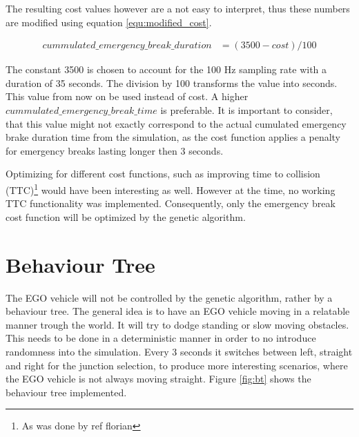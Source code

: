The resulting cost values however are a not easy to interpret, thus these numbers are modified using equation \ref{equ:modified_cost}.

\begin{equation} 
	\label{equ:modified_cost}
	\begin{split}
		cummulated\_emergency\_break\_duration & = (3500 - cost) / 100
	\end{split}
\end{equation}

The constant 3500 is chosen to account for the 100 Hz sampling rate with a duration of 35 seconds. The division by 100 transforms the value into seconds. This value from now on be used instead of cost. A higher $cummulated\_emergency\_break\_time$ is preferable. It is important to consider, that this value might not exactly correspond to the actual cumulated emergency brake duration time from the simulation, as the cost function applies a penalty for emergency breaks lasting longer then 3 seconds.

Optimizing for different cost functions, such as improving time to collision (TTC)\footnote{As was done by ref florian} would have been interesting as well. However at the time, no working TTC functionality was implemented. Consequently, only the emergency break cost function will be optimized by the genetic algorithm.

\section{Behaviour Tree}
The EGO vehicle will not be controlled by the genetic algorithm, rather by a behaviour tree. The general idea is to have an EGO vehicle moving in a relatable manner trough the world. It will try to dodge standing or slow moving obstacles. This needs to be done in a deterministic manner in order to no introduce randomness into the simulation. Every 3 seconds it switches between left, straight and right for the junction selection, to produce more interesting scenarios, where the EGO vehicle is not always moving straight. Figure \ref{fig:bt} shows the behaviour tree implemented.


